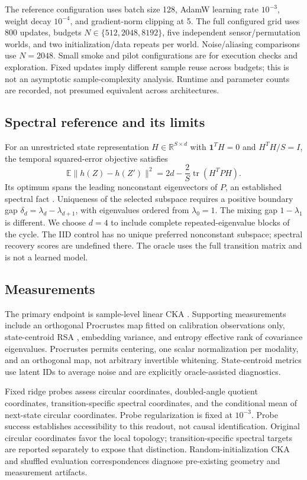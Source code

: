 \documentclass[11pt,a4paper]{article}
\newcommand{\E}{\mathbb{E}}
\newcommand{\R}{\mathbb{R}}
\begin{document}
The reference configuration uses batch size 128, AdamW learning rate $10^{-3}$, weight decay $10^{-4}$, and gradient-norm clipping at 5. The full configured grid uses 800 updates, budgets $N\in\{512,2048,8192\}$, five independent sensor/permutation worlds, and two initialization/data repeats per world. Noise/aliasing comparisons use $N=2048$. Small smoke and pilot configurations are for execution checks and exploration. Fixed updates imply different sample reuse across budgets; this is not an asymptotic sample-complexity analysis. Runtime and parameter counts are recorded, not presumed equivalent across architectures.

\subsection{Spectral reference and its limits}
For an unrestricted state representation $H\in\R^{S\times d}$ with $\mathbf1^TH=0$ and $H^TH/S=I$, the temporal squared-error objective satisfies
\begin{equation}
\E\|h(Z)-h(Z')\|^2=2d-\frac2S\operatorname{tr}(H^TPH).
\end{equation}
Its optimum spans the leading nonconstant eigenvectors of $P$, an established spectral fact \citep{wiskott2002,belkin2003,balestriero2022}. Uniqueness of the selected subspace requires a positive boundary gap $\delta_d=\lambda_d-\lambda_{d+1}$, with eigenvalues ordered from $\lambda_0=1$. The mixing gap $1-\lambda_1$ is different. We choose $d=4$ to include complete repeated-eigenvalue blocks of the cycle. The IID control has no unique preferred nonconstant subspace; spectral recovery scores are undefined there. The oracle uses the full transition matrix and is not a learned model.

\subsection{Measurements}
The primary endpoint is sample-level linear CKA \citep{kornblith2019}. Supporting measurements include an orthogonal Procrustes map fitted on calibration observations only, state-centroid RSA \citep{kriegeskorte2008}, embedding variance, and entropy effective rank of covariance eigenvalues. Procrustes permits centering, one scalar normalization per modality, and an orthogonal map, not arbitrary invertible whitening. State-centroid metrics use latent IDs to average noise and are explicitly oracle-assisted diagnostics.

Fixed ridge probes assess circular coordinates, doubled-angle quotient coordinates, transition-specific spectral coordinates, and the conditional mean of next-state circular coordinates. Probe regularization is fixed at $10^{-3}$. Probe success establishes accessibility to this readout, not causal identification. Original circular coordinates favor the local topology; transition-specific spectral targets are reported separately to expose that distinction. Random-initialization CKA and shuffled evaluation correspondences diagnose pre-existing geometry and measurement artifacts.
\end{document}

